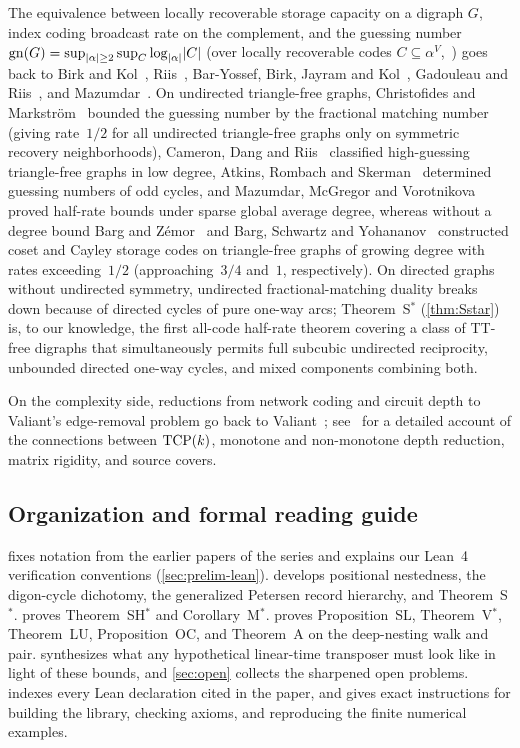 The equivalence between locally recoverable storage capacity on a digraph $G$, index coding broadcast rate on the
complement, and the guessing number $\mathrm{gn}(G) = \sup_{\lvert \alpha \rvert \ge 2} \sup_{C} \log_{\lvert \alpha \rvert} \lvert C \rvert$ (over
locally recoverable codes $C \subseteq \alpha^V$,~\cite{Riis2007,SeventhPaper2026}) goes back to Birk and Kol~\cite{BirkKol2006},
Riis~\cite{Riis2007}, Bar-Yossef, Birk, Jayram and Kol~\cite{BBJK2011}, Gadouleau and Riis~\cite{GadouleauRiis2011}, and
Mazumdar~\cite{Mazumdar2014}. On undirected triangle-free graphs, Christofides and Markstr\"om~\cite{ChristofidesMarkstrom2011}
bounded the guessing number by the fractional matching number (giving rate~$1/2$ for all undirected triangle-free graphs
only on symmetric recovery neighborhoods), Cameron, Dang and Riis~\cite{CameronDangRiis2016} classified high-guessing
triangle-free graphs in low degree, Atkins, Rombach and Skerman~\cite{AtkinsRombachSkerman2017} determined guessing
numbers of odd cycles, and Mazumdar, McGregor and Vorotnikova~\cite{MMV2019} proved half-rate bounds under sparse global
average degree, whereas without a degree bound Barg and Z\'emor~\cite{BargZemor2022} and Barg, Schwartz and
Yohananov~\cite{BSY2024} constructed coset and Cayley storage codes on triangle-free graphs of growing degree with rates
exceeding~$1/2$ (approaching~$3/4$ and~$1$, respectively).
On directed graphs without undirected symmetry, undirected fractional-matching duality breaks down because of directed
cycles of pure one-way arcs; Theorem~S$^*$ (\cref{thm:Sstar}) is, to our knowledge, the first all-code half-rate theorem
covering a class of TT-free digraphs that simultaneously permits full subcubic undirected reciprocity, unbounded
directed one-way cycles, and mixed components combining both.

On the complexity side, reductions from network coding and circuit depth to Valiant's edge-removal problem go back to
Valiant~\cite{Valiant1977}; see~\cite{FirstPaper2026,FourthPaper2026,EighthPaper2026,NinthPaper2026} for a detailed
account of the connections between $\mathrm{TCP}(k)$, monotone and non-monotone depth reduction, matrix rigidity, and source
covers.

\subsection{Organization and formal reading guide}

 fixes notation from the earlier papers of the series and explains our Lean~4 verification conventions
(\cref{sec:prelim-lean}).  develops positional nestedness, the digon-cycle dichotomy, the
generalized Petersen record hierarchy, and Theorem~S$^*$.  proves Theorem~SH$^*$ and Corollary~M$^*$.
 proves Proposition~SL, Theorem~V$^*$, Theorem~LU, Proposition~OC, and Theorem~A on the deep-nesting walk
and pair.  synthesizes what any hypothetical linear-time transposer must look like in light of
these bounds, and \cref{sec:open} collects the sharpened open problems.  indexes every Lean declaration
cited in the paper, and  gives exact instructions for building the library, checking axioms, and
reproducing the finite numerical examples.
